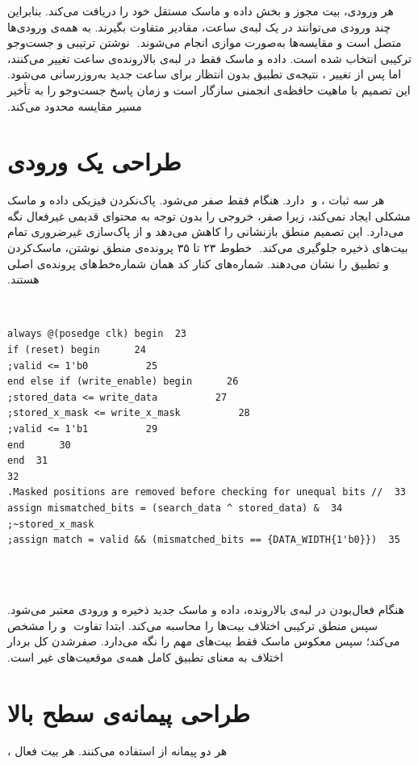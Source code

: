 ‫
‫
‫هر ورودی، بیت مجوز و بخش داده و ماسک مستقل خود را دریافت می‌کند. بنابراین چند ورودی
‫می‌توانند در یک لبه‌ی ساعت، مقادیر متفاوت بگیرند.  به همه‌ی ورودی‌ها
‫متصل است و مقایسه‌ها به‌صورت موازی انجام می‌شوند.
‫
‫نوشتن ترتیبی و جست‌وجو ترکیبی انتخاب شده است. داده و ماسک فقط در لبه‌ی بالارونده‌ی ساعت
‫تغییر می‌کنند، اما پس از تغییر ، نتیجه‌ی تطبیق بدون انتظار برای ساعت جدید
‫به‌روزرسانی می‌شود. این تصمیم با ماهیت حافظه‌ی انجمنی سازگار است و زمان پاسخ جست‌وجو را به
‫تأخیر مسیر مقایسه محدود می‌کند.
‫
‫\section{طراحی یک ورودی }
‫
‫هر  سه ثبات ،  و
‫ دارد. هنگام  فقط  صفر می‌شود. پاک‌نکردن فیزیکی داده و
‫ماسک مشکلی ایجاد نمی‌کند، زیرا  صفر، خروجی  را بدون توجه به محتوای
‫قدیمی غیرفعال نگه می‌دارد. این تصمیم منطق بازنشانی را کاهش می‌دهد و از پاک‌سازی غیرضروری
‫تمام بیت‌های ذخیره جلوگیری می‌کند.
‫
‫خطوط ۲۳ تا ۳۵ پرونده‌ی  منطق نوشتن، ماسک‌کردن و تطبیق را نشان می‌دهند.
‫شماره‌های کنار کد همان شماره‌خط‌های پرونده‌ی اصلی هستند.
‫
‫\begin{dsdlcodeblock}
‫\begin{verbatim}
‫23  always @(posedge clk) begin
‫24      if (reset) begin
‫25          valid <= 1'b0;
‫26      end else if (write_enable) begin
‫27          stored_data <= write_data;
‫28          stored_x_mask <= write_x_mask;
‫29          valid <= 1'b1;
‫30      end
‫31  end
‫32
‫33  // Masked positions are removed before checking for unequal bits.
‫34  assign mismatched_bits = (search_data ^ stored_data) & ~stored_x_mask;
‫35  assign match = valid && (mismatched_bits == {DATA_WIDTH{1'b0}});
‫\end{verbatim}
‫\end{dsdlcodeblock}
‫
‫هنگام فعال‌بودن  در لبه‌ی بالارونده، داده و ماسک جدید ذخیره و ورودی
‫معتبر می‌شود. سپس منطق ترکیبی اختلاف بیت‌ها را محاسبه می‌کند. ابتدا  تفاوت
‫ و  را مشخص می‌کند؛ سپس معکوس ماسک فقط بیت‌های مهم
‫را نگه می‌دارد. صفرشدن کل بردار اختلاف به معنای تطبیق کامل همه‌ی موقعیت‌های غیر  است.
‫
‫\section{طراحی پیمانه‌ی سطح بالا}
‫
‫هر دو پیمانه از  استفاده می‌کنند. هر بیت فعال ،
